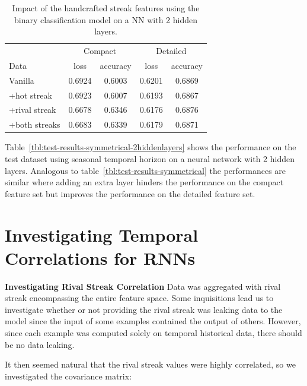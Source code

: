 \documentclass{article} %
\begin{document}
\begin{table}
\centering
  \begin{tabular}{|l|c|c|c|c|}
  \hline
   & \multicolumn{2}{|c|}{Compact} & \multicolumn{2}{|c|}{Detailed}\\
  Data & loss & accuracy & loss & accuracy\\
  \hline
  Vanilla       & 0.6924 & 0.6003 & 0.6201 & 0.6869\\ 
  +hot streak   & 0.6923 & 0.6007 & 0.6193 & 0.6867\\
  +rival streak & 0.6678 & 0.6346 & 0.6176 & 0.6876\\
  +both streaks & 0.6683 & 0.6339 & 0.6179 & 0.6871\\
  \hline
  \end{tabular}
  \caption{Impact of the handcrafted streak features using the binary classification model on a NN with 2 hidden layers.}
\end{table}
\label{tbl:test-results-symmetrical-2hiddenlayers}

Table~\ref{tbl:test-results-symmetrical-2hiddenlayers} shows the performance on the test dataset using seasonal temporal horizon on a neural network with 2 hidden layers.
Analogous to table~\ref{tbl:test-results-symmetrical} the performances are similar where adding an extra layer hinders the performance on the compact feature set but improves the performance on the detailed feature set.



\section{Investigating Temporal Correlations for RNNs}

\textbf{Investigating Rival Streak Correlation}
Data was aggregated with rival streak encompassing the entire feature space.
Some inquisitions lead us to investigate whether or not providing the rival streak was leaking data to the model since the input of some examples contained the output of others.
However, since each example was computed solely on temporal historical data, there should be no data leaking.

It then seemed natural that the rival streak values were highly correlated, so we investigated the covariance matrix:
\end{document}
